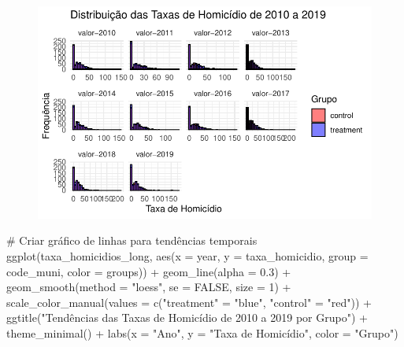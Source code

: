 \documentclass[
  letterpaper,
  DIV=11,
  numbers=noendperiod]{scrartcl}
\newenvironment{Shaded}{\begin{snugshade}}{\end{snugshade}}
\newcommand{\AttributeTok}[1]{\textcolor[rgb]{0.40,0.45,0.13}{#1}}
\newcommand{\CommentTok}[1]{\textcolor[rgb]{0.37,0.37,0.37}{#1}}
\newcommand{\ConstantTok}[1]{\textcolor[rgb]{0.56,0.35,0.01}{#1}}
\newcommand{\DecValTok}[1]{\textcolor[rgb]{0.68,0.00,0.00}{#1}}
\newcommand{\FloatTok}[1]{\textcolor[rgb]{0.68,0.00,0.00}{#1}}
\newcommand{\FunctionTok}[1]{\textcolor[rgb]{0.28,0.35,0.67}{#1}}
\newcommand{\NormalTok}[1]{\textcolor[rgb]{0.00,0.23,0.31}{#1}}
\newcommand{\OtherTok}[1]{\textcolor[rgb]{0.00,0.23,0.31}{#1}}
\newcommand{\SpecialCharTok}[1]{\textcolor[rgb]{0.37,0.37,0.37}{#1}}
\newcommand{\StringTok}[1]{\textcolor[rgb]{0.13,0.47,0.30}{#1}}
\begin{document}
\begin{figure}[H]

{\centering \includegraphics{maps_files/figure-pdf/unnamed-chunk-20-1.pdf}

}

\end{figure}

\begin{Shaded}
\begin{Highlighting}[]
\CommentTok{\# Criar gráfico de linhas para tendências temporais}
\FunctionTok{ggplot}\NormalTok{(taxa\_homicidios\_long, }\FunctionTok{aes}\NormalTok{(}\AttributeTok{x =}\NormalTok{ year, }\AttributeTok{y =}\NormalTok{ taxa\_homicidio, }\AttributeTok{group =}\NormalTok{ code\_muni, }\AttributeTok{color =}\NormalTok{ groups)) }\SpecialCharTok{+}
  \FunctionTok{geom\_line}\NormalTok{(}\AttributeTok{alpha =} \FloatTok{0.3}\NormalTok{) }\SpecialCharTok{+}
  \FunctionTok{geom\_smooth}\NormalTok{(}\AttributeTok{method =} \StringTok{"loess"}\NormalTok{, }\AttributeTok{se =} \ConstantTok{FALSE}\NormalTok{, }\AttributeTok{size =} \DecValTok{1}\NormalTok{) }\SpecialCharTok{+}
  \FunctionTok{scale\_color\_manual}\NormalTok{(}\AttributeTok{values =} \FunctionTok{c}\NormalTok{(}\StringTok{"treatment"} \OtherTok{=} \StringTok{"blue"}\NormalTok{, }\StringTok{"control"} \OtherTok{=} \StringTok{"red"}\NormalTok{)) }\SpecialCharTok{+}
  \FunctionTok{ggtitle}\NormalTok{(}\StringTok{"Tendências das Taxas de Homicídio de 2010 a 2019 por Grupo"}\NormalTok{) }\SpecialCharTok{+}
  \FunctionTok{theme\_minimal}\NormalTok{() }\SpecialCharTok{+}
  \FunctionTok{labs}\NormalTok{(}\AttributeTok{x =} \StringTok{"Ano"}\NormalTok{, }\AttributeTok{y =} \StringTok{"Taxa de Homicídio"}\NormalTok{, }\AttributeTok{color =} \StringTok{"Grupo"}\NormalTok{)}
\end{Highlighting}
\end{Shaded}
\end{document}
